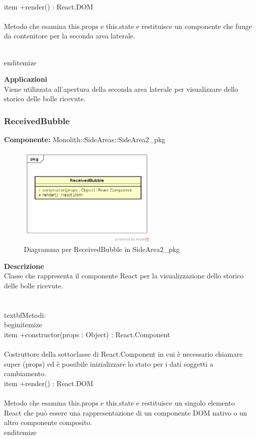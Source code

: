 \\item +render() : React.DOM 
\\\\
Metodo che esamina this.props e this.state e restituisce un componente che funge da contenitore per la seconda area laterale.

\\end{itemize} 


\textbf{Applicazioni}\\
Viene utilizzata all'apertura della seconda area laterale per visualizzare dello storico delle bolle ricevute. 


\clearpage

\subsubsection{ReceivedBubble}
\textbf{Componente:}  Monolith::SideAreas::SideArea2\_pkg\\
   \FloatBarrier
   \begin{figure}[ht]
   \centering
   \includegraphics[width=0.6\textwidth]{img/single-ReceivedBubble}
   \caption{{Diagramma per ReceivedBubble in SideArea2\_pkg}}
\end{figure}
\FloatBarrier
\textbf{Descrizione}\\
Classe che rappresenta il componente React per la visualizzazione dello storico delle bolle ricevute. \\\\
\\textbf{Metodi:} 
\\begin{itemize}
\\item +constructor(props : Object) : React.Component 
\\\\
Costruttore della sottoclasse di React.Component in cui è necessario chiamare super (props) ed è possibile inizializzare lo stato per i dati soggetti a cambiamento.
\\item +render() : React.DOM 
\\\\
Metodo che esamina this.props e this.state e restituisce un singolo elemento React che può essere una rappresentazione di un componente DOM nativo o un altro componente composito.
\\end{itemize} 


